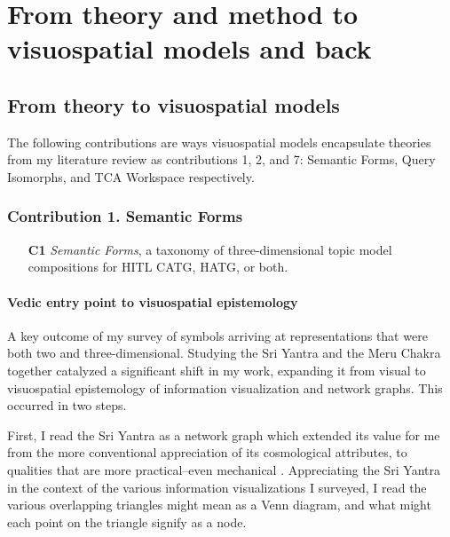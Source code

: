 \chapter{From theory and method to visuospatial models and back}

\section{From theory to visuospatial models}

\noindent The following contributions are ways visuospatial models encapsulate theories from my literature review as contributions 1, 2, and 7: Semantic Forms, Query Isomorphs, and TCA Workspace respectively.  
 

\subsection{Contribution 1. Semantic Forms}
\begin{itemize}
        \item[\textbf{C1}] \textit{Semantic Forms}, a taxonomy of three-dimensional topic model compositions for HITL CATG, HATG, or both.
\end{itemize}

\subsubsection{Vedic entry point to visuospatial epistemology}
A key outcome of my survey of symbols arriving at representations that were both two and three-dimensional. Studying the Sri Yantra and the Meru Chakra together catalyzed a significant shift in my work, expanding it from visual to visuospatial epistemology of information visualization and network graphs. This occurred in two steps. 
    

First, I read the Sri Yantra as a network graph which extended its value for me from the more conventional appreciation of its cosmological attributes, to qualities that are more practical–even mechanical \citep[p. 28]{buhnemann_mandalas_2003}. Appreciating the Sri Yantra in the context of the various information visualizations I surveyed, I read the various overlapping triangles might mean as a Venn diagram, and what might each point on the triangle signify as a node.

